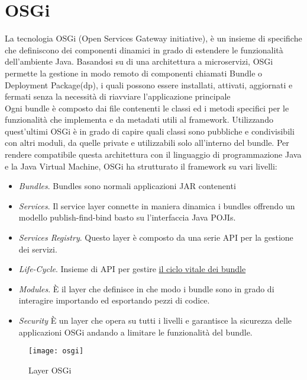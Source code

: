 \section{OSGi}
La tecnologia OSGi (Open Services Gateway initiative),
è un insieme di specifiche che definiscono dei componenti
dinamici in grado di estendere le funzionalità dell'ambiente  Java.
Basandosi su di una architettura a microservizi, OSGi permette la gestione in
modo remoto di componenti chiamati Bundle o Deployment Package(dp), i quali
possono essere installati, attivati, aggiornati e fermati senza la necessità di
riavviare l'applicazione principale\\
Ogni bundle è composto dai file contenenti le classi ed i metodi specifici per le
funzionalità che implementa e da  metadati utili al framework.
Utilizzando quest'ultimi OSGi è in grado di capire quali classi sono pubbliche e
condivisibili con altri moduli, da quelle private e utilizzabili solo
all'interno del bundle.
Per rendere compatibile questa architettura con il linguaggio di programmazione
Java e la Java Virtual Machine, OSGi ha strutturato il framework su vari
livelli:
\begin{itemize}
        \item   \textit{Bundles}. Bundles sono normali applicazioni JAR contenenti
        \item   \textit{Services}. Il service layer connette in maniera dinamica
                i bundles offrendo un modello publish-find-bind basto su
                l'interfaccia Java POJIs.
        \item   \textit{Services Registry}. Questo layer è composto da una serie
                 API per la gestione dei servizi.
        \item   \textit{Life-Cycle}. Insieme di API per gestire \hyperlink{cycle_bundle}{il ciclo vitale
                dei bundle}
        \item   \textit{Modules}. È il layer che definisce in che modo i bundle
                sono in grado di interagire importando ed esportando pezzi di
                codice.
        \item   \textit{Security} È un layer che opera su tutti i livelli e
                garantisce la sicurezza delle applicazioni OSGi andando a
                limitare le funzionalità del bundle.
\end{itemize}
\begin{figure}[th]
\centering 
\texttt{[image: osgi]}
\caption{Layer OSGi}
\label{}
\end{figure}

